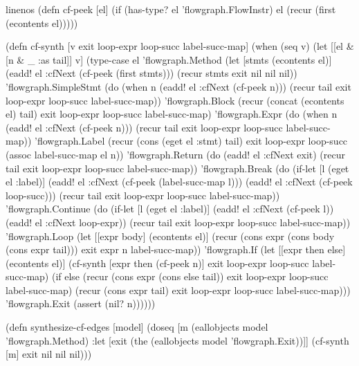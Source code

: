 \documentclass[submission]{eptcs}
\begin{document}
\begin{clojurecode*}{linenos}
(defn cf-peek [el]
  (if (has-type? el 'flowgraph.FlowInstr)
    el
    (recur (first (econtents el)))))

(defn cf-synth [v exit loop-expr loop-succ label-succ-map]
  (when (seq v)
    (let [[el & [n & _ :as tail]] v]
      (type-case el
        'flowgraph.Method
                   (let [stmts (econtents el)]
                     (eadd! el :cfNext (cf-peek (first stmts)))
                     (recur stmts exit nil nil nil))
        'flowgraph.SimpleStmt
                   (do (when n (eadd! el :cfNext (cf-peek n)))
                       (recur tail exit loop-expr loop-succ label-succ-map))
        'flowgraph.Block
                   (recur (concat (econtents el) tail)
                          exit loop-expr loop-succ label-succ-map)
        'flowgraph.Expr
                   (do (when n (eadd! el :cfNext (cf-peek n)))
                       (recur tail exit loop-expr loop-succ label-succ-map))
        'flowgraph.Label
                   (recur (cons (eget el :stmt) tail) exit loop-expr loop-succ
                          (assoc label-succ-map el n))
        'flowgraph.Return
                   (do (eadd! el :cfNext exit)
                       (recur tail exit loop-expr loop-succ label-succ-map))
        'flowgraph.Break
                   (do (if-let [l (eget el :label)]
                         (eadd! el :cfNext (cf-peek (label-succ-map l)))
                         (eadd! el :cfNext (cf-peek loop-succ)))
                       (recur tail exit loop-expr loop-succ label-succ-map))
        'flowgraph.Continue
                   (do (if-let [l (eget el :label)]
                         (eadd! el :cfNext (cf-peek l))
                         (eadd! el :cfNext loop-expr))
                       (recur tail exit loop-expr loop-succ label-succ-map))
        'flowgraph.Loop
                   (let [[expr body] (econtents el)]
                     (recur (cons expr (cons body (cons expr tail)))
                            exit expr n label-succ-map))
        'flowgraph.If
                   (let [[expr then else] (econtents el)]
                     (cf-synth [expr then (cf-peek n)]
                               exit loop-expr loop-succ label-succ-map)
                     (if else
                       (recur (cons expr (cons else tail))
                              exit loop-expr loop-succ label-succ-map)
                       (recur (cons expr tail)
                              exit loop-expr loop-succ label-succ-map)))
        'flowgraph.Exit (assert (nil? n))))))

(defn synthesize-cf-edges [model]
  (doseq [m (eallobjects model 'flowgraph.Method)
          :let [exit (the (eallobjects model 'flowgraph.Exit))]]
    (cf-synth [m] exit nil nil nil)))
\end{clojurecode*}
\end{document}
